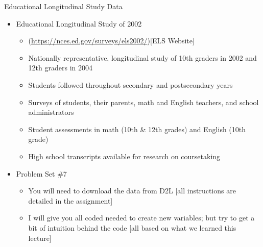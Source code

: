 \documentclass[
  8pt,
  ignorenonframetext,
  dvipsnames]{beamer}
\providecommand{\tightlist}{%
  \setlength{\itemsep}{0pt}\setlength{\parskip}{0pt}}
\let\olditem\item
\renewcommand{\item}{%
  \olditem\vspace{4pt}
}
\begin{document}
\begin{frame}{Educational Longitudinal Study Data}
\protect\hypertarget{educational-longitudinal-study-data}{}

\begin{itemize}
\tightlist
\item
  Educational Longitudinal Study of 2002

  \begin{itemize}
  \tightlist
  \item
    (\url{https://nces.ed.gov/surveys/els2002/}){[}ELS Website{]}
  \item
    Nationally representative, longitudinal study of 10th graders in
    2002 and 12th graders in 2004
  \item
    Students followed throughout secondary and postsecondary years
  \item
    Surveys of students, their parents, math and English teachers, and
    school administrators
  \item
    Student assessments in math (10th \& 12th grades) and English (10th
    grade)
  \item
    High school transcripts available for research on coursetaking
  \end{itemize}
\end{itemize}

\medskip

\begin{itemize}
\tightlist
\item
  Problem Set \#7

  \begin{itemize}
  \tightlist
  \item
    You will need to download the data from D2L {[}all instructions are
    detailed in the assignment{]}
  \item
    I will give you all coded needed to create new variables; but try to
    get a bit of intuition behind the code {[}all based on what we
    learned this lecture{]}
  \end{itemize}
\end{itemize}

\end{frame}
\end{document}
